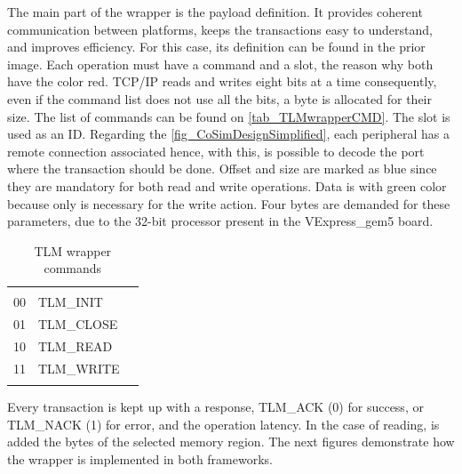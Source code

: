 The main part of the wrapper is the payload definition. It provides coherent communication between platforms, keeps the transactions
easy to understand, and improves efficiency. For this case, its definition can be found in the prior image. Each operation must 
have a command and a slot, the reason why both have the color red. TCP/IP reads and writes eight bits at a time 
consequently, even if the command list does not use all the bits, a byte is allocated for their size. The list of commands can be found on
\autoref{tab_TLMwrapperCMD}. The slot is used as an ID. Regarding the \autoref{fig_CoSimDesignSimplified}, each peripheral has a remote 
connection associated hence, with this, is possible to decode the port where the transaction should be done. Offset and size are 
marked as blue since they are mandatory for both read and write operations. 
Data is with green color because only is necessary for the write action. Four bytes are demanded for these parameters, due to the 32-bit
processor present in the VExpress\_gem5 board.

\begin{table}[h!]
	\centering
	\begin{tabular}{lll}
	\cline{1-2}
	\multicolumn{1}{|l|}{\cellcolor[HTML]{C0C0C0}{\color[HTML]{000000} Bits}} & \multicolumn{1}{l|}{\cellcolor[HTML]{C0C0C0}{\color[HTML]{000000} Command}} &  \\ \cline{1-2}
	\multicolumn{1}{|l|}{00} & \multicolumn{1}{l|}{TLM\_INIT} &  \\ \cline{1-2}
	\multicolumn{1}{|l|}{01} & \multicolumn{1}{l|}{TLM\_CLOSE} &  \\ \cline{1-2}
	\multicolumn{1}{|l|}{10} & \multicolumn{1}{l|}{TLM\_READ} &  \\ \cline{1-2}
	\multicolumn{1}{|l|}{11} & \multicolumn{1}{l|}{TLM\_WRITE} &  \\ \cline{1-2}
	 &  & 
	\end{tabular}%
	\caption{TLM wrapper commands}
	\label{tab_TLMwrapperCMD}
\end{table}

Every transaction is kept up with a response, TLM\_ACK (0) for success, or TLM\_NACK (1) for error, and the operation latency. 
In the case of reading, is added the bytes of the selected memory region. The next figures demonstrate how the wrapper is implemented in both 
frameworks.

